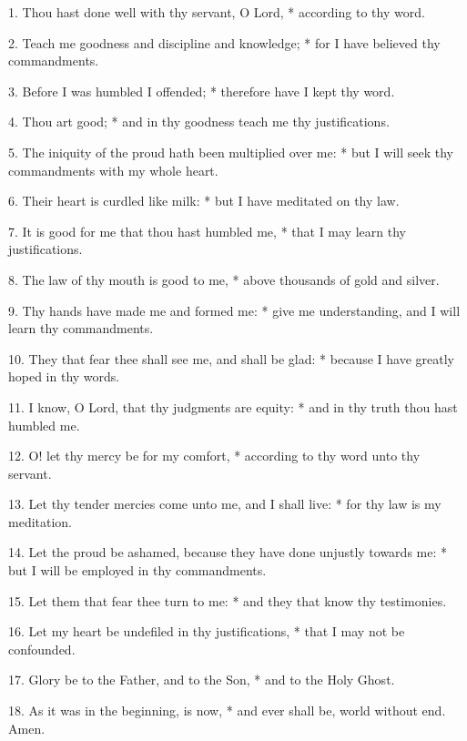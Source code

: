 1. Thou hast done well with thy servant, O Lord, * according to thy word.

2. Teach me goodness and discipline and knowledge; * for I have believed thy commandments.

3. Before I was humbled I offended; * therefore have I kept thy word.

4. Thou art good; * and in thy goodness teach me thy justifications.

5. The iniquity of the proud hath been multiplied over me: * but I will seek thy commandments with my whole heart.

6. Their heart is curdled like milk: * but I have meditated on thy law.

7. It is good for me that thou hast humbled me, * that I may learn thy justifications.

8. The law of thy mouth is good to me, * above thousands of gold and silver.

9. Thy hands have made me and formed me: * give me understanding, and I will learn thy commandments.

10. They that fear thee shall see me, and shall be glad: * because I have greatly hoped in thy words.

11. I know, O Lord, that thy judgments are equity: * and in thy truth thou hast humbled me.

12. O! let thy mercy be for my comfort, * according to thy word unto thy servant.

13. Let thy tender mercies come unto me, and I shall live: * for thy law is my meditation.

14. Let the proud be ashamed, because they have done unjustly towards me: * but I will be employed in thy commandments.

15. Let them that fear thee turn to me: * and they that know thy testimonies.

16. Let my heart be undefiled in thy justifications, * that I may not be confounded.

17. Glory be to the Father, and to the Son, * and to the Holy Ghost.

18. As it was in the beginning, is now, * and ever shall be, world without end. Amen.